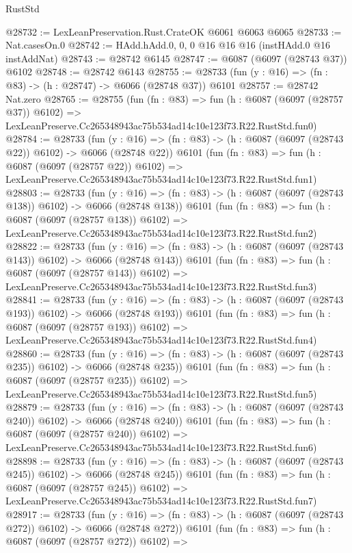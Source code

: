 \begin{lexlean}{RustStd}
\begin{coremodule}
@28732 := LexLeanPreservation.Rust.CrateOK @6061 @6063 @6065
@28733 := Nat.casesOn.{0}
@28742 := HAdd.hAdd.{0, 0, 0} @16 @16 @16 (instHAdd.{0} @16 instAddNat)
@28743 := @28742 @6145
@28747 := @6087 (@6097 (@28743 @37)) @6102
@28748 := @28742 @6143
@28755 := @28733 (fun (y : @16) => (fn : @83) -> (h : @28747) -> @6066 (@28748 @37)) @6101
@28757 := @28742 Nat.zero
@28765 := @28755
    (fun (fn : @83) =>
    fun (h : @6087 (@6097 (@28757 @37)) @6102) =>
    LexLeanPreserve.Cc265348943ac75b534ad14c10e123f73.R22.RustStd.fun0)
@28784 := @28733
    (fun (y : @16) => (fn : @83) -> (h : @6087 (@6097 (@28743 @22)) @6102) -> @6066 (@28748 @22))
    @6101
    (fun (fn : @83) =>
    fun (h : @6087 (@6097 (@28757 @22)) @6102) =>
    LexLeanPreserve.Cc265348943ac75b534ad14c10e123f73.R22.RustStd.fun1)
@28803 := @28733
    (fun (y : @16) => (fn : @83) -> (h : @6087 (@6097 (@28743 @138)) @6102) -> @6066 (@28748 @138))
    @6101
    (fun (fn : @83) =>
    fun (h : @6087 (@6097 (@28757 @138)) @6102) =>
    LexLeanPreserve.Cc265348943ac75b534ad14c10e123f73.R22.RustStd.fun2)
@28822 := @28733
    (fun (y : @16) => (fn : @83) -> (h : @6087 (@6097 (@28743 @143)) @6102) -> @6066 (@28748 @143))
    @6101
    (fun (fn : @83) =>
    fun (h : @6087 (@6097 (@28757 @143)) @6102) =>
    LexLeanPreserve.Cc265348943ac75b534ad14c10e123f73.R22.RustStd.fun3)
@28841 := @28733
    (fun (y : @16) => (fn : @83) -> (h : @6087 (@6097 (@28743 @193)) @6102) -> @6066 (@28748 @193))
    @6101
    (fun (fn : @83) =>
    fun (h : @6087 (@6097 (@28757 @193)) @6102) =>
    LexLeanPreserve.Cc265348943ac75b534ad14c10e123f73.R22.RustStd.fun4)
@28860 := @28733
    (fun (y : @16) => (fn : @83) -> (h : @6087 (@6097 (@28743 @235)) @6102) -> @6066 (@28748 @235))
    @6101
    (fun (fn : @83) =>
    fun (h : @6087 (@6097 (@28757 @235)) @6102) =>
    LexLeanPreserve.Cc265348943ac75b534ad14c10e123f73.R22.RustStd.fun5)
@28879 := @28733
    (fun (y : @16) => (fn : @83) -> (h : @6087 (@6097 (@28743 @240)) @6102) -> @6066 (@28748 @240))
    @6101
    (fun (fn : @83) =>
    fun (h : @6087 (@6097 (@28757 @240)) @6102) =>
    LexLeanPreserve.Cc265348943ac75b534ad14c10e123f73.R22.RustStd.fun6)
@28898 := @28733
    (fun (y : @16) => (fn : @83) -> (h : @6087 (@6097 (@28743 @245)) @6102) -> @6066 (@28748 @245))
    @6101
    (fun (fn : @83) =>
    fun (h : @6087 (@6097 (@28757 @245)) @6102) =>
    LexLeanPreserve.Cc265348943ac75b534ad14c10e123f73.R22.RustStd.fun7)
@28917 := @28733
    (fun (y : @16) => (fn : @83) -> (h : @6087 (@6097 (@28743 @272)) @6102) -> @6066 (@28748 @272))
    @6101
    (fun (fn : @83) =>
    fun (h : @6087 (@6097 (@28757 @272)) @6102) =>

\end{coremodule}
\end{lexlean}
